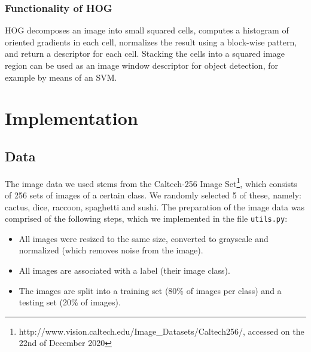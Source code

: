 \documentclass{scrartcl}
\begin{document}
\subsubsection{Functionality of HOG}

HOG decomposes an image into small squared cells, computes a histogram of oriented gradients in each cell, normalizes the result using a block-wise pattern, and return a descriptor for each cell. Stacking the cells into a squared image region can be used as an image window descriptor for object detection, for example by means of an SVM.

\section{Implementation}
\subsection{Data}
The image data we used stems from the Caltech-256 Image Set\footnote{http://www.vision.caltech.edu/Image\_Datasets/Caltech256/, accessed on the 22nd of December 2020}, which consists of 256 sets of images of a certain class. We randomly selected 5 of these, namely: cactus, dice, raccoon, spaghetti and sushi. The preparation of the image data was comprised of the following steps, which we implemented in the file \texttt{utils.py}:
\begin{itemize}
  \item All images were resized to the same size, converted to grayscale and normalized (which removes noise from the image).
  \item All images are associated with a label (their image class).
  \item The images are split into a training set (80\% of images per class) and a testing set (20\% of images).
\end{itemize}
\end{document}
